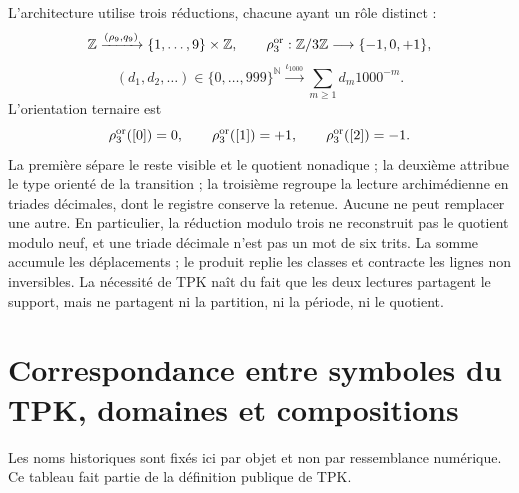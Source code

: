 L'architecture utilise trois réductions, chacune ayant un rôle distinct :
\[
 \mathbb Z\xrightarrow{(\rho_9,q_9)}
 \{1,\ldots,9\}\times\mathbb Z,
 \qquad
 \rho_3^{\rm or}:\mathbb Z/3\mathbb Z\longrightarrow
 \{-1,0,+1\},
\]
\[
 (d_1,d_2,\ldots)\in\{0,\ldots,999\}^{\mathbb N}
 \xrightarrow{\iota_{1000}}
 \sum_{m\geq1}d_m1000^{-m}.
\]
L'orientation ternaire est
\[
 \rho_3^{\rm or}([0])=0,\qquad
 \rho_3^{\rm or}([1])=+1,\qquad
 \rho_3^{\rm or}([2])=-1.
\]
La première sépare le reste visible et le quotient nonadique ; la deuxième attribue le
type orienté de la transition ; la troisième regroupe la lecture archimédienne
en triades décimales, dont le registre conserve la retenue. Aucune ne peut
remplacer une autre.
En particulier, la réduction modulo trois ne reconstruit pas le quotient modulo
neuf, et une triade décimale n'est pas un mot de six trits.
La somme accumule les déplacements ; le produit replie les classes et contracte les
lignes non inversibles. La nécessité de TPK naît du fait que les deux lectures
partagent le support, mais ne partagent ni la partition, ni la période, ni le quotient.

\section{Correspondance entre symboles du TPK, domaines et compositions}
\label{sec:diccionario-interno-tpk}

Les noms historiques sont fixés ici par objet et non par ressemblance
numérique. Ce tableau fait partie de la définition publique de TPK.

